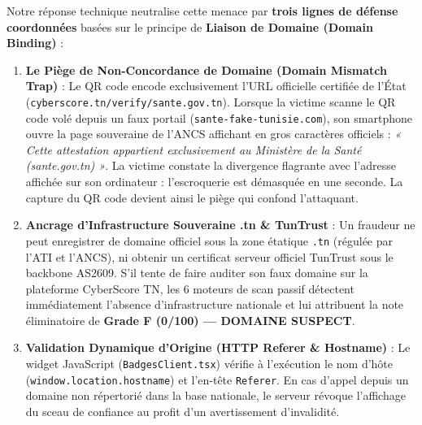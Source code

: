 Notre réponse technique neutralise cette menace par \textbf{trois lignes de défense coordonnées} basées sur le principe de \textbf{Liaison de Domaine (Domain Binding)} :
\begin{enumerate}
    \item \textbf{Le Piège de Non-Concordance de Domaine (Domain Mismatch Trap)} : Le QR code encode exclusivement l'URL officielle certifiée de l'État (\texttt{cyberscore.tn/verify/sante.gov.tn}). Lorsque la victime scanne le QR code volé depuis un faux portail (\texttt{sante-fake-tunisie.com}), son smartphone ouvre la page souveraine de l'ANCS affichant en gros caractères officiels : \textit{« Cette attestation appartient exclusivement au Ministère de la Santé (sante.gov.tn) »}. La victime constate la divergence flagrante avec l'adresse affichée sur son ordinateur : l'escroquerie est démasquée en une seconde. La capture du QR code devient ainsi le piège qui confond l'attaquant.
    \item \textbf{Ancrage d'Infrastructure Souveraine .tn \& TunTrust} : Un fraudeur ne peut enregistrer de domaine officiel sous la zone étatique \texttt{.tn} (régulée par l'ATI et l'ANCS), ni obtenir un certificat serveur officiel TunTrust sous le backbone AS2609. S'il tente de faire auditer son faux domaine sur la plateforme CyberScore TN, les 6 moteurs de scan passif détectent immédiatement l'absence d'infrastructure nationale et lui attribuent la note éliminatoire de \textbf{Grade F (0/100) — DOMAINE SUSPECT}.
    \item \textbf{Validation Dynamique d'Origine (HTTP Referer \& Hostname)} : Le widget JavaScript (\texttt{BadgesClient.tsx}) vérifie à l'exécution le nom d'hôte (\texttt{window.location.hostname}) et l'en-tête \texttt{Referer}. En cas d'appel depuis un domaine non répertorié dans la base nationale, le serveur révoque l'affichage du sceau de confiance au profit d'un avertissement d'invalidité.
\end{enumerate}

